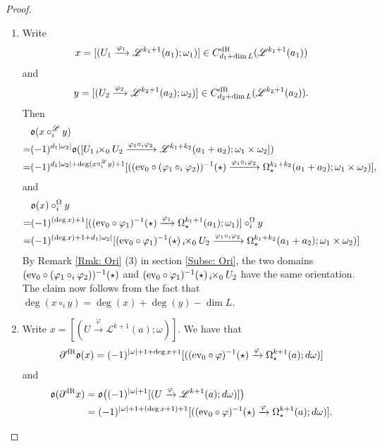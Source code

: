 \documentclass[10pt]{amsart}
\numberwithin{equation}{section}
\theoremstyle{plain}
\theoremstyle{definition}
\theoremstyle{remark}
\numberwithin{equation}{section}
\newcommand{\ev}{\textup{ev}}
\newcommand{\dR}{\textup{dR}}
\newcommand{\fiberprod}[2]{\,_{#1}\!\!\times_{#2} }
\begin{document}
{\begin{proof}
	\begin{enumerate}
		\item Write \[ x=[(U_1\xrightarrow{\varphi_1}\mathscr{L}^{k_1+1}(a_1);\omega_1)] \in C_{d_1+\dim L}^\dR(\mathscr{L}^{k_1+1}(a_1))\] and \[ y = [(U_2\xrightarrow{\varphi_2}\mathscr{L}^{k_2+1}(a_2);\omega_2)] \in C^\dR_{d_2+\dim L}(\mathscr{L}^{k_2+1}(a_2)) . \]
		Then 
		\begin{align*}
			&\mathfrak{o}(x\circ_i^\mathscr{L} y) \\=& (-1)^{d_1 |\omega_2|}\mathfrak{o}([U_1\fiberprod{i}{0} U_2\xrightarrow{\varphi_1\circ_i \varphi_2} \mathscr{L}^{k_1+k_2}(a_1+a_2);  \omega_1\times \omega_2])\\
			=& (-1)^{d_1|\omega_2|+\deg(x\circ_i^\mathscr{L} y)+1}[( (\ev_0\circ(\varphi_1\circ_i\varphi_2))^{-1}(\star) \xrightarrow{\varphi_1\circ_i \varphi_2} \Omega_\star^{k_1+k_2}(a_1+a_2); \omega_1\times \omega_2 ) ],
		\end{align*}
		and
		\begin{align*}
			&\mathfrak{o}(x)\circ_i^\Omega y\\=& (-1)^{(\deg x)+1}[( (\ev_0\circ\varphi_1)^{-1}(\star)\xrightarrow{\varphi_1} \Omega_\star^{k_1+1}(a_1) ;\omega_1  )]\circ_i^\Omega y\\
			=& (-1)^{(\deg x)+1+d_1|\omega_2|}[( \ev_0\circ\varphi_1)^{-1}(\star) \fiberprod{i}{0} U_2 \xrightarrow{\varphi_1\circ_i \varphi_2} \Omega_\star^{k_1+k_2}(a_1+a_2)  ; \omega_1\times \omega_2)]
		\end{align*}
		By Remark \ref{Rmk: Ori} (3) in section \ref{Subsc: Ori}, the two domains $(\ev_0\circ(\varphi_1\circ_i\varphi_2))^{-1}(\star)$ and  $( \ev_0\circ\varphi_1)^{-1}(\star) \fiberprod{i}{0} U_2$ have the same orientation. The claim  now follows from the fact that $\deg(x\circ_i y) = \deg(x)+\deg (y)-\dim L$.
		\item Write $x=[(U\xrightarrow{\varphi} \mathscr{L}^{k+1}(a);\omega)]$. We have that 
		\begin{align*}
			\partial^\dR \mathfrak{o}(x) = (-1)^{|\omega|+1+\deg x + 1}[((\ev_0\circ \varphi)^{-1}(\star)\xrightarrow{\varphi} \Omega_\star^{k+1}(a);d\omega)]
		\end{align*}
		and  \begin{align*}
			\mathfrak{o}(\partial^\dR x)& = \mathfrak{o}\big((-1)^{|\omega|+1} [(U\xrightarrow{\varphi} \mathscr{L}^{k+1}(a); d\omega)]\big) \\&= (-1)^{|\omega|+1+(\deg x+1)+1}[((\ev_0\circ \varphi)^{-1}(\star)\xrightarrow{\varphi} \Omega_\star^{k+1}(a); d\omega)].

\end{align*}
\end{enumerate}
\end{proof}}
\end{document}
